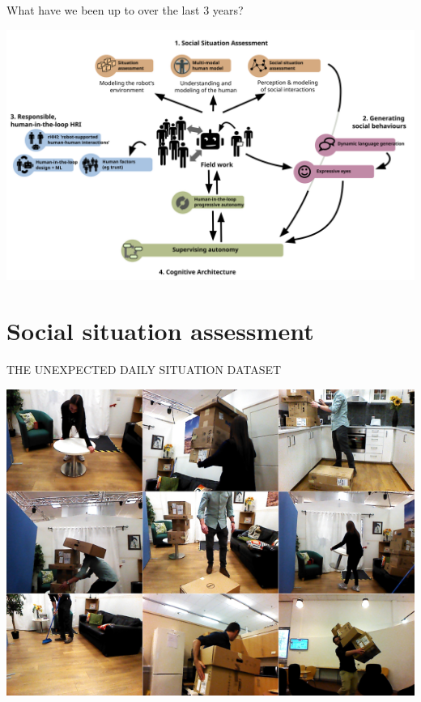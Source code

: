 \documentclass[xcolor=table]{beamer}
\begin{document}
\begin{frame}{What have we been up to over the last 3 years?}
    \begin{center}
        \includegraphics[width=\linewidth]{architectures/sota2021}
    \end{center}
\end{frame}

\section{Social situation assessment}

{

\begin{frame}{THE UNEXPECTED DAILY SITUATION DATASET}
    \begin{center}
        \includegraphics[width=0.8\linewidth]{uds/mosaic}
    \end{center}

\end{frame}
}
\end{document}
